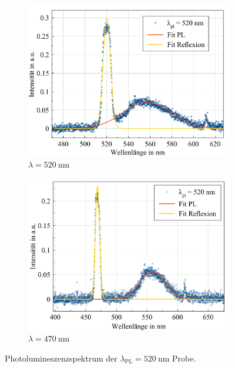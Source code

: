 \begin{figure}[H]
  \centering
  \begin{subfigure}{0.49\textwidth}
    \includegraphics[width=\textwidth]{plots/Weisslicht_520_520.png}
    \caption{$\lambda=\SI{520}{\nano\meter}$}
  \end{subfigure}
  \begin{subfigure}{0.49\textwidth}
    \includegraphics[width=\textwidth]{plots/Weisslicht_520_470.png}
    \caption{$\lambda=\SI{470}{\nano\meter}$}
  \end{subfigure}
  \caption{Photolumineszenzspektrum der $\lambda_{\text{PL}}=\SI{520}{\nano\meter}$ Probe.}
  \label{fig:PL_520}
\end{figure}
